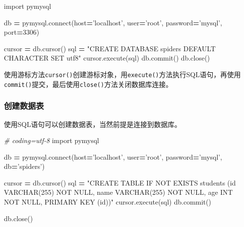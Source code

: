 \documentclass[]{ctexbook}
\newenvironment{Shaded}{\begin{snugshade}}{\end{snugshade}}
\newcommand{\CommentTok}[1]{\textcolor[rgb]{0.56,0.35,0.01}{\textit{#1}}}
\newcommand{\DecValTok}[1]{\textcolor[rgb]{0.00,0.00,0.81}{#1}}
\newcommand{\ExtensionTok}[1]{#1}
\newcommand{\ImportTok}[1]{#1}
\newcommand{\NormalTok}[1]{#1}
\newcommand{\OperatorTok}[1]{\textcolor[rgb]{0.81,0.36,0.00}{\textbf{#1}}}
\newcommand{\StringTok}[1]{\textcolor[rgb]{0.31,0.60,0.02}{#1}}
\begin{document}
\begin{Shaded}
\begin{Highlighting}[]
\ImportTok{import}\NormalTok{ pymysql}

\NormalTok{db }\OperatorTok{=}\NormalTok{ pymysql.}\ExtensionTok{connect}\NormalTok{(host}\OperatorTok{=}\StringTok{'localhost'}\NormalTok{, user}\OperatorTok{=}\StringTok{'root'}\NormalTok{,}
\NormalTok{                     password}\OperatorTok{=}\StringTok{'mysql'}\NormalTok{, port}\OperatorTok{=}\DecValTok{3306}\NormalTok{)}

\NormalTok{cursor }\OperatorTok{=}\NormalTok{ db.cursor()}
\NormalTok{sql }\OperatorTok{=} \StringTok{"CREATE DATABASE spiders DEFAULT CHARACTER SET utf8"}
\NormalTok{cursor.execute(sql)}
\NormalTok{db.commit()}
\NormalTok{db.close()}
\end{Highlighting}
\end{Shaded}

使用游标方法\texttt{cursor()}创建游标对象，用\texttt{execute()}方法执行SQL语句，再使用\texttt{commit()}提交，最后使用\texttt{close()}方法关闭数据库连接。

\hypertarget{ux521bux5efaux6570ux636eux8868}{%
\subsubsection{创建数据表}\label{ux521bux5efaux6570ux636eux8868}}

使用SQL语句可以创建数据表，当然前提是连接到数据库。

\begin{Shaded}
\begin{Highlighting}[]
\CommentTok{# coding=utf-8}
\ImportTok{import}\NormalTok{ pymysql}

\NormalTok{db }\OperatorTok{=}\NormalTok{ pymysql.}\ExtensionTok{connect}\NormalTok{(host}\OperatorTok{=}\StringTok{'localhost'}\NormalTok{, user}\OperatorTok{=}\StringTok{'root'}\NormalTok{,}
\NormalTok{                     password}\OperatorTok{=}\StringTok{'mysql'}\NormalTok{, db}\OperatorTok{=}\StringTok{'spiders'}\NormalTok{)}

\NormalTok{cursor }\OperatorTok{=}\NormalTok{ db.cursor()}
\NormalTok{sql }\OperatorTok{=} \StringTok{"CREATE TABLE IF NOT EXISTS students (id VARCHAR(255) NOT NULL, name VARCHAR(255) NOT NULL, age INT NOT NULL, PRIMARY KEY (id))"}
\NormalTok{cursor.execute(sql)}
\NormalTok{db.commit()}

\NormalTok{db.close()}
\end{Highlighting}
\end{Shaded}
\end{document}
